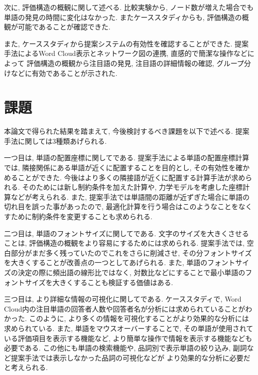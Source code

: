 \documentclass[syuuron]{kuee}
\begin{document}
		次に, 評価構造の概観に関して述べる. 
		比較実験から, ノード数が増えた場合でも単語の発見の時間に変化はなかった. 
		またケーススタディからも, 評価構造の概観が可能であることが確認できた. 
		
		また, ケーススタディから提案システムの有効性を確認することができた. 
		提案手法によるWord Cloud表示とネットワーク図の連携, 直感的で簡潔な操作などによって
		評価構造の概観から注目語の発見, 注目語の詳細情報の確認, グループ分けなどに有効であることが示された. 		
		
	\section{課題}
		本論文で得られた結果を踏まえて, 今後検討するべき課題を以下で述べる. 
		提案手法に関しては3種類あげられる. 
		
		一つ目は, 単語の配置座標に関してである. 
		提案手法による単語の配置座標計算では, 隣接関係にある単語が近くに配置することを目的とし, その有効性を確かめることができた. 
		今後はより多くの隣接語が近くに配置する計算手法が求められる. 
		そのためには新し制約条件を加えた計算や, 力学モデルを考慮した座標計算などが考えられる. 
		また, 提案手法では単語間の距離が近ずぎた場合に単語の切れ目を誤った事があったので, 
		最適化計算を行う場合はこのようなことをなくすために制約条件を変更することも求められる. 
		
		二つ目は, 単語のフォントサイズに関してである. 
		文字のサイズを大きくさせることは, 評価構造の概観をより容易にするためには求められる. 
		提案手法では, 空白部分がまだ多く残っていたのでこれをさらに削減させ, その分フォントサイズを大きくすることが改善点の一つとしてあげられる. 
		また, 単語のフォントサイズの決定の際に頻出語の線形比ではなく, 対数比などにすることで最小単語のフォントサイズを大きくすることも検証する価値はある. 
		
		三つ目は, より詳細な情報の可視化に関してである. 
		ケーススタディで, Word Cloud内の注目単語の回答者人数や回答者名が分析には求められていることがわかった. 
		このように, より多くの情報を可視化することがより効果的な分析には求められている. 
		また, 単語をマウスオーバーすることで, その単語が使用されている評価項目を表示する機能など, 
		より簡単な操作で情報を表示する機能なども必要である. 
		この他にも単語の検索機能や, 品詞別で表示単語の絞り込み, 副詞など提案手法では表示しなかった品詞の可視化などが
		より効果的な分析に必要だと考えられる. 
		
\end{document}
